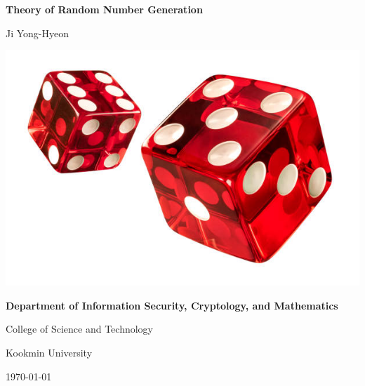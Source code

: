 \documentclass[12pt,openany]{book}
\theoremstyle{definition}
\begin{document}
	
	\begin{titlepage}
		\begin{center}
			{\Huge\textsf{\textbf{Theory of Random Number Generation}}\par}
			\vspace{0.5in}
			{\Large Ji Yong-Hyeon\par}
			\vspace{1in}
			\includegraphics[scale=2]{rng.jpg}\par
			\vspace{1in}\large
			{\bf Department of Information Security, Cryptology, and Mathematics\par}
			{College of Science and Technology\par}
			{Kookmin University\par}
			\vspace{.25in}
			{\large \today\par}
		\end{center}
	\end{titlepage}
	
	\tableofcontents
	
	\mainmatter
	
\end{document}
